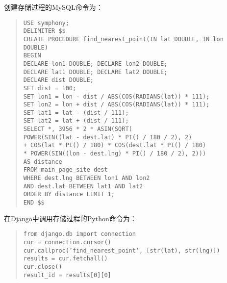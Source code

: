 创建存储过程的MySQL命令为：
\begin{quote}
  \texttt{USE symphony;\\
    DELIMITER \$\$\\
    CREATE PROCEDURE find\_nearest\_point(IN lat DOUBLE, IN lon DOUBLE)\\
    BEGIN\\
    DECLARE lon1 DOUBLE; DECLARE lon2 DOUBLE;\\
    DECLARE lat1 DOUBLE; DECLARE lat2 DOUBLE;\\
    DECLARE dist DOUBLE;\\
    SET dist = 100;\\
    SET lon1 = lon - dist / ABS(COS(RADIANS(lat)) * 111);\\
    SET lon2 = lon + dist / ABS(COS(RADIANS(lat)) * 111);\\
    SET lat1 = lat - (dist / 111);\\
    SET lat2 = lat + (dist / 111);\\
    SELECT *, 3956 * 2 * ASIN(SQRT(\\
    POWER(SIN((lat - dest.lat) * PI() / 180 / 2), 2)\\
    + COS(lat * PI() / 180) * COS(dest.lat * PI() / 180)\\
    * POWER(SIN((lon - dest.lng) * PI() / 180 / 2), 2)))\\
    AS distance\\
    FROM main\_page\_site dest\\
    WHERE dest.lng BETWEEN lon1 AND lon2\\
    AND dest.lat BETWEEN lat1 AND lat2\\
    ORDER BY distance LIMIT 1;\\
    END \$\$} 
\end{quote}

在Django中调用存储过程的Python命令为：
\begin{quote}
  \texttt{from django.db import connection\\
    cur = connection.cursor()\\
    cur.callproc('find\_nearest\_point', [str(lat), str(lng)])\\
    results = cur.fetchall()\\
    cur.close()\\
    result\_id = results[0][0]}
\end{quote}


